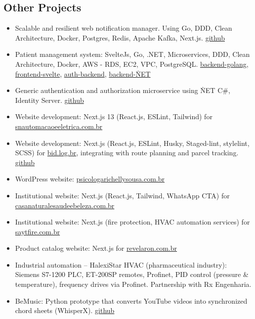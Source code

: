 \documentclass[11pt,a4paper,sans]{moderncv}
\begin{document}
\begin{samepage}
	\section{Other Projects}
	\begin{itemize}[itemsep=0cm, leftmargin=0.6cm, label={\textbullet}]
		\item Scalable and resilient web notification manager. Using Go, DDD, Clean Architecture, Docker, Postgres, Redis, Apache Kafka, Next.js. {\color{blue}\href{https://github.com/beriloqueiroz/desafio-dev}{github}}
		\item Patient management system: SvelteJs, Go, .NET, Microservices, DDD, Clean Architecture, Docker, AWS - RDS, EC2, VPC, PostgreSQL.
			      {\color{blue}\href{https://github.com/beriloqueiroz/prontu-go}{backend-golang}}, {\color{blue}\href{https://github.com/beriloqueiroz/prontu-front}{frontend-svelte}}, {\color{blue}\href{https://github.com/beriloqueiroz/auth-prontu}{auth-backend}}, {\color{blue}\href{https://github.com/beriloqueiroz/prontu}{backend-\.NET}}
		\item Generic authentication and authorization microservice using \.NET C\#, Identity Server. {\color{blue}\href{https://github.com/beriloqueiroz/auth-user}{github}}
		\item Website development: Next.js 13 (React.js, ESLint, Tailwind) for {\color{blue}\href{https://snautomacaoeeletrica.com.br}{snautomacaoeeletrica.com.br}}
		\item Website development: Next.js (React.js, ESLint, Husky, Staged-lint, stylelint, SCSS) for \underline{bid.log.br}, integrating with route planning and parcel tracking. {\color{blue}\href{https://github.com/beriloqueiroz/bid-site}{github}}
		\item WordPress website: {\color{blue}\href{psicologarichellysousa.com.br}{psicologarichellysousa.com.br}}
		\item Institutional website: Next.js (React.js, Tailwind, WhatsApp CTA) for {\color{blue}\href{https://casanaturalesaudeebeleza.com.br}{casanaturalesaudeebeleza.com.br}}
		\item Institutional website: Next.js (fire protection, HVAC automation services) for {\color{blue}\href{https://saytfire.com.br}{saytfire.com.br}}
		\item Product catalog website: Next.js for {\color{blue}\href{https://revelaron.com.br}{revelaron.com.br}}
		\item Industrial automation -- HalexiStar HVAC (pharmaceutical industry): Siemens S7-1200 PLC, ET-200SP remotes, Profinet, PID control (pressure \& temperature), frequency drives via Profinet. Partnership with Rx Engenharia.
		\item BeMusic: Python prototype that converts YouTube videos into synchronized chord sheets (WhisperX). {\color{blue}\href{https://github.com/beriloqueiroz/bemusic}{github}}
	\end{itemize}
\end{samepage}
\vspace{\baselineskip}
\end{document}
